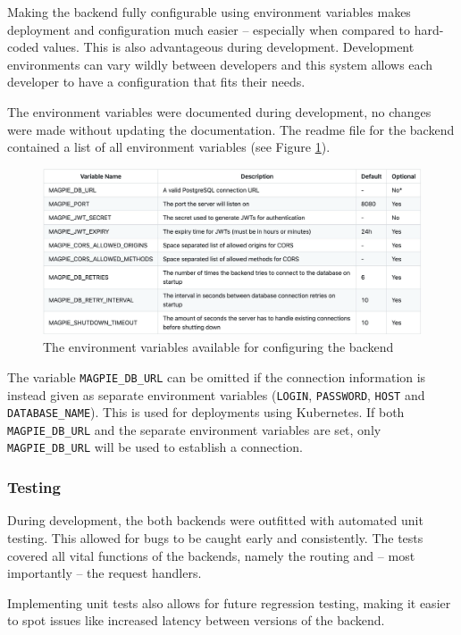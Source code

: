 Making the backend fully configurable using environment variables makes
deployment and configuration much easier -- especially when compared to
hard-coded values. This is also advantageous during development. Development
environments can vary wildly between developers and this system allows each
developer to have a configuration that fits their needs.

The environment variables were documented during development, no changes were
made without updating the documentation. The readme file for the backend
contained a list of all environment variables (see Figure
\ref{fig:backend_env}).

\begin{figure}[htbp]
  \centering{}
  \includegraphics[width=\textwidth]{images/backend_env.png}
  \caption{The environment variables available for configuring the backend}
  \label{fig:backend_env}
\end{figure}

The variable \texttt{MAGPIE\_DB\_URL} can be omitted if the connection information
is instead given as separate environment variables (\texttt{LOGIN},
\texttt{PASSWORD}, \texttt{HOST} and \texttt{DATABASE\_NAME}). This is used for
deployments using Kubernetes. If both \texttt{MAGPIE\_DB\_URL} and the separate
environment variables are set, only \texttt{MAGPIE\_DB\_URL} will be used to
establish a connection.

\subsubsection{Testing}
During development, the both backends were outfitted with automated unit
testing. This allowed for bugs to be caught early and consistently. The tests
covered all vital functions of the backends, namely the routing and -- most
importantly -- the request handlers.

Implementing unit tests also allows for future regression testing, making it
easier to spot issues like increased latency between versions of the backend.

